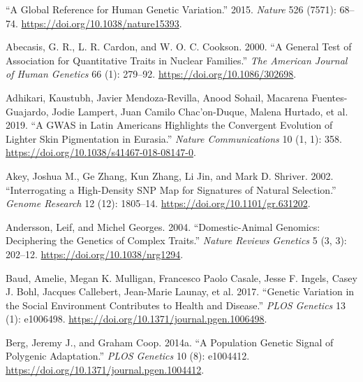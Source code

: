 \documentclass[
]{book}
\newlength{\cslhangindent}
\newlength{\cslentryspacingunit} %
\newenvironment{CSLReferences}[2] %
 {%
  \setlength{\parindent}{0pt}
  \ifodd #1
  \let\oldpar\par
  \def\par{\hangindent=\cslhangindent\oldpar}
  \fi
  \setlength{\parskip}{#2\cslentryspacingunit}
 }%
 {}
\begin{document}
\hypertarget{refs}{}
\begin{CSLReferences}{1}{0}
\leavevmode{}%
{``A Global Reference for Human Genetic Variation.''} 2015. \emph{Nature} 526 (7571): 68--74. \url{https://doi.org/10.1038/nature15393}.

\leavevmode{}%
Abecasis, G. R., L. R. Cardon, and W. O. C. Cookson. 2000. {``A {General Test} of {Association} for {Quantitative Traits} in {Nuclear Families}.''} \emph{The American Journal of Human Genetics} 66 (1): 279--92. \url{https://doi.org/10.1086/302698}.

\leavevmode{}%
Adhikari, Kaustubh, Javier Mendoza-Revilla, Anood Sohail, Macarena Fuentes-Guajardo, Jodie Lampert, Juan Camilo Chac'on-Duque, Malena Hurtado, et al. 2019. {``A {GWAS} in {Latin Americans} Highlights the Convergent Evolution of Lighter Skin Pigmentation in {Eurasia}.''} \emph{Nature Communications} 10 (1, 1): 358. \url{https://doi.org/10.1038/s41467-018-08147-0}.

\leavevmode{}%
Akey, Joshua M., Ge Zhang, Kun Zhang, Li Jin, and Mark D. Shriver. 2002. {``Interrogating a {High-Density SNP Map} for {Signatures} of {Natural Selection}.''} \emph{Genome Research} 12 (12): 1805--14. \url{https://doi.org/10.1101/gr.631202}.

\leavevmode{}%
Andersson, Leif, and Michel Georges. 2004. {``Domestic-Animal Genomics: Deciphering the Genetics of Complex Traits.''} \emph{Nature Reviews Genetics} 5 (3, 3): 202--12. \url{https://doi.org/10.1038/nrg1294}.

\leavevmode{}%
Baud, Amelie, Megan K. Mulligan, Francesco Paolo Casale, Jesse F. Ingels, Casey J. Bohl, Jacques Callebert, Jean-Marie Launay, et al. 2017. {``Genetic {Variation} in the {Social Environment Contributes} to {Health} and {Disease}.''} \emph{PLOS Genetics} 13 (1): e1006498. \url{https://doi.org/10.1371/journal.pgen.1006498}.

\leavevmode{}%
Berg, Jeremy J., and Graham Coop. 2014a. {``A {Population Genetic Signal} of {Polygenic Adaptation}.''} \emph{PLOS Genetics} 10 (8): e1004412. \url{https://doi.org/10.1371/journal.pgen.1004412}.


\end{CSLReferences}
\end{document}
